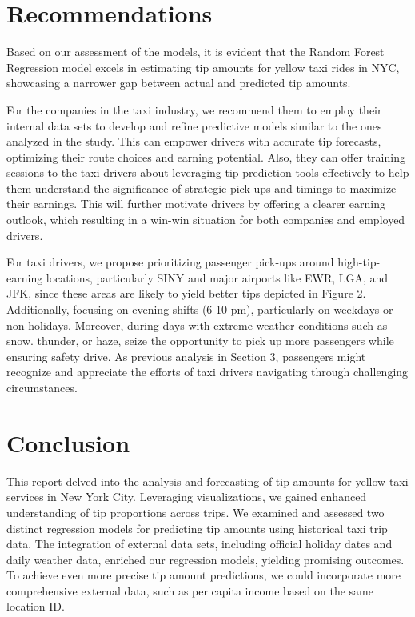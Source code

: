 \documentclass[11pt]{article}
\begin{document}
\section{Recommendations}
Based on our assessment of the models, it is evident that the Random Forest Regression model excels in estimating tip amounts for yellow taxi rides in NYC, showcasing a narrower gap between actual and predicted tip amounts.

For the companies in the taxi industry, we recommend them to employ their internal data sets to develop and refine predictive models similar to the ones analyzed in the study. This can empower drivers with accurate tip forecasts, optimizing their route choices and earning potential. Also, they can offer training sessions to the taxi drivers about leveraging tip prediction tools effectively to help them understand the significance of strategic pick-ups and timings to maximize their earnings. This will further motivate drivers by offering a clearer earning outlook, which resulting in a win-win situation for both companies and employed drivers. 

For taxi drivers, we propose prioritizing passenger pick-ups around high-tip-earning locations, particularly SINY and major airports like EWR, LGA, and JFK, since these areas are likely to yield better tips depicted in Figure 2. Additionally, focusing on evening shifts (6-10 pm), particularly on weekdays or non-holidays. Moreover, during days with extreme weather conditions such as snow. thunder, or haze, seize the opportunity to pick up more passengers while ensuring safety drive. As previous analysis in Section 3, passengers might recognize and appreciate the efforts of taxi drivers navigating through challenging circumstances. 

\section{Conclusion}
This report delved into the analysis and forecasting of tip amounts for yellow taxi services in New York City. Leveraging visualizations, we gained enhanced understanding of tip proportions across trips. We examined and assessed two distinct regression models for predicting tip amounts using historical taxi trip data. The integration of external data sets, including official holiday dates and daily weather data, enriched our regression models, yielding promising outcomes. To achieve even more precise tip amount predictions, we could incorporate more comprehensive external data, such as per capita income based on the same location ID.
\clearpage

\printbibliography
\end{document}
